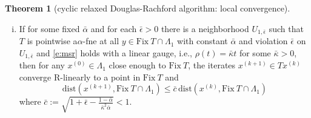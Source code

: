 \documentclass[12pt]{article}
\theoremstyle{definition}
\newtheorem{theorem}{Theorem}
\renewcommand{\equiv}{:=}
\newcommand{\paren}[1]{\left(#1\right)}
\newcommand{\dist}{\mathrm{dist}}
\newcommand{\Fix}{\mathrm{Fix}\ }
\begin{document}
\begin{theorem}[cyclic relaxed Douglas-Rachford algorithm: local convergence]
\begin{enumerate}[(i)]
If in addition $\theta_{\alpha, \epsilon}$ satisfies one of the
conditions in Assumption \ref{a:msr convergence} with the parameter values
$\alpha$ and $\epsilon$ above, then for all $x^{(0)}$ close enough to $\Fix T$
in $\Lambda_1$,  $x^{(k)}\to \bar x\in \Fix T\cap \Lambda_1$
with rate
 $O\paren{\theta_{\tau, \epsilon}^{(k)}(t_0)}$
 in case
 Assumption \ref{a:msr convergence}\eqref{t:msr convergence, necessary sublin}
 ($t_0\equiv\dist(x^{(0)}, \Fix T\cap \Lambda_1)$),
 and with rate  $O(s_k(t_0))$ for
$s_k(t)\equiv
\sum_{j=k}^\infty \theta_{\tau, \epsilon}^{(j)}(t)$
in case Assumption \ref{a:msr convergence}\eqref{t:msr convergence, necessary lin+}.

\item\label{theo:convergence.CDRl iii} If for some fixed $\bar\alpha$ and for each $\bar\epsilon>0$
there is a neighborhood  $U_{1, \bar\epsilon}$ such that $T$ is pointwise
a$\alpha$-fne at all $y\in\Fix T\cap \Lambda_1$ with constant $\bar\alpha$ and
violation $\bar\epsilon$ on $U_{1,\bar\epsilon}$ and
\eqref{e:msr} holds with a linear gauge, i.e., $\rho(t)=\bar\kappa t$ for
some $\bar\kappa>0$, then for any $x^{(0)}\in \Lambda_1$ close enough to $\Fix T$,
the iterates $x^{(k+1)}\in Tx^{(k)}$ converge R-linearly to a point in $\Fix T$ and
\begin{equation}\label{eq:CDRl.rate}
    \dist(x^{(k+1)},\Fix T\cap \Lambda_1)\leq \bar c\, \dist(x^{(k)},\Fix T\cap \Lambda_1)
\end{equation}
where
$\bar c:=\sqrt{1+\bar\epsilon-\tfrac{1-\bar\alpha}{\bar\kappa^2\bar\alpha}}<1$.
\end{enumerate}
\end{theorem}
\end{document}
